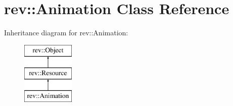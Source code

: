 \hypertarget{classrev_1_1_animation}{}\section{rev\+::Animation Class Reference}
\label{classrev_1_1_animation}
Inheritance diagram for rev\+::Animation\+:\begin{figure}[H]
\begin{center}
\leavevmode
\includegraphics[height=3.000000cm]{classrev_1_1_animation}
\end{center}
\end{figure}
